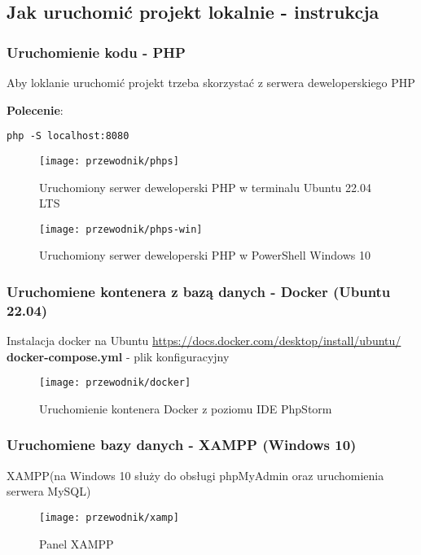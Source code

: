         \subsection{Jak uruchomić projekt lokalnie - instrukcja}


        \subsubsection{Uruchomienie kodu - PHP}
        Aby loklanie uruchomić projekt trzeba skorzystać z serwera deweloperskiego PHP

        \textbf{Polecenie}:
        \begin{lstlisting}
php -S localhost:8080
        \end{lstlisting}
        \newpage




        \begin{figure}[!htb]
            \centering
            \texttt{[image: przewodnik/phps]}
            \caption{Uruchomiony serwer deweloperski PHP w terminalu Ubuntu 22.04 LTS }                
        \end{figure}

        \begin{figure}[!htb]
            \centering
            \texttt{[image: przewodnik/phps-win]}
            \caption{Uruchomiony serwer deweloperski PHP w PowerShell Windows 10}                
        \end{figure}

        \subsubsection{Uruchomiene kontenera z bazą danych -  Docker (Ubuntu 22.04)}
        Instalacja docker na Ubuntu \url{https://docs.docker.com/desktop/install/ubuntu/}\\
        \textbf{docker-compose.yml} - plik konfiguracyjny \\
        
        \begin{figure}[!htb]
            \centering
            \texttt{[image: przewodnik/docker]}
            \caption{Uruchomienie kontenera Docker z poziomu IDE PhpStorm}                
        \end{figure}


        \pagebreak
        \subsubsection{Uruchomiene bazy danych -  XAMPP (Windows 10)}
        XAMPP(na Windows 10 służy do obsługi phpMyAdmin oraz uruchomienia serwera MySQL)
        \begin{figure}[!htb]
            \centering
            \texttt{[image: przewodnik/xamp]}
            \caption{Panel XAMPP}                
        \end{figure}


